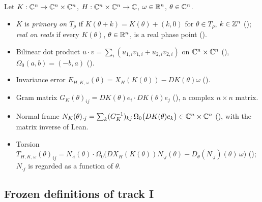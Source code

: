 \begin{definition}\label{bpI:p0:stripdata}
Let $K:\mathbb{C}^n\to\mathbb{C}^n\times\mathbb{C}^n$, $H:\mathbb{C}^n\times\mathbb{C}^n\to\mathbb{C}$, $\omega\in\mathbb{R}^n$, $\theta\in\mathbb{C}^n$.
\begin{itemize}
\item $K$ is \emph{primary on $T_\rho$} if $K(\theta+k)=K(\theta)+(k,0)$ for $\theta\in T_\rho$, $k\in\mathbb{Z}^n$
  (); \emph{real on reals} if every $K(\theta)$, $\theta\in\mathbb{R}^n$, is a real phase point
  ().
\item Bilinear dot product $u\cdot v=\sum_i(u_{1,i}v_{1,i}+u_{2,i}v_{2,i})$ on $\mathbb{C}^n\times\mathbb{C}^n$ (),
  $\Omega_0(a,b)=(-b,a)$ ().
\item Invariance error $E_{H,K,\omega}(\theta)=X_H(K(\theta))-DK(\theta)\omega$ ().
\item Gram matrix $G_K(\theta)_{ij}=DK(\theta)e_i\cdot DK(\theta)e_j$ (), a complex $n\times n$ matrix.
\item Normal frame $N_K(\theta)_{\cdot j}=\sum_k(G_K^{-1})_{kj}\,\Omega_0\bigl(DK(\theta)e_k\bigr)\in\mathbb{C}^n\times\mathbb{C}^n$ (),
  with the matrix inverse of Lean.
\item Torsion $T_{H,K,\omega}(\theta)_{ij}=N_{\cdot i}(\theta)\cdot\Omega_0\bigl(DX_H(K(\theta))N_{\cdot j}(\theta)-
  D_\theta(N_{\cdot j})(\theta)\,\omega\bigr)$ (); $N_{\cdot j}$ is regarded as a function of $\theta$.
\end{itemize}
\end{definition}

\subsection{Frozen definitions of track I}\label{bpI:p0:idefs}


